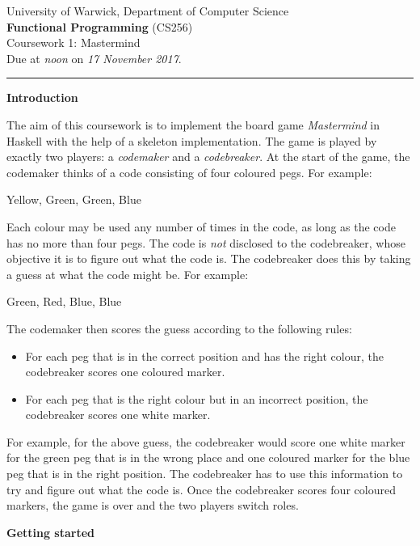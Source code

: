 \documentclass{../cs256-shared/cs256}
\author{Michael B. Gale}
\begin{document}
{\large University of Warwick, Department of Computer Science} \\[0.1cm]
{\huge\textbf{Functional Programming} (CS256)} \\[0.1cm]
{\huge Coursework 1: Mastermind} \\[0.4cm]
Due at \emph{noon} on \emph{17 November 2017}. \\[0.20cm]

\hrule \vspace{0.5cm}

\textbf{Introduction}

The aim of this coursework is to implement the board game \emph{Mastermind} in Haskell with the help of a skeleton implementation. The game is played by exactly two players: a \emph{codemaker} and a \emph{codebreaker}. At the start of the game, the codemaker thinks of a code consisting of four coloured pegs. For example:
\begin{center}
    Yellow, Green, Green, Blue
\end{center}
Each colour may be used any number of times in the code, as long as the code has no more than four pegs. The code is \emph{not} disclosed to the codebreaker, whose objective it is to figure out what the code is. The codebreaker does this by taking a guess at what the code might be. For example:
\begin{center}
    Green, Red, Blue, Blue
\end{center}
The codemaker then scores the guess according to the following rules:
\begin{itemize}
    \item For each peg that is in the correct position and has the right colour, the codebreaker scores one coloured marker.
    \item For each peg that is the right colour but in an incorrect position, the codebreaker scores one white marker.
\end{itemize}
For example, for the above guess, the codebreaker would score one white marker for the green peg that is in the wrong place and one coloured marker for the blue peg that is in the right position. The codebreaker has to use this information to try and figure out what the code is. Once the codebreaker scores four coloured markers, the game is over and the two players switch roles.

\textbf{Getting started}
\end{document}
